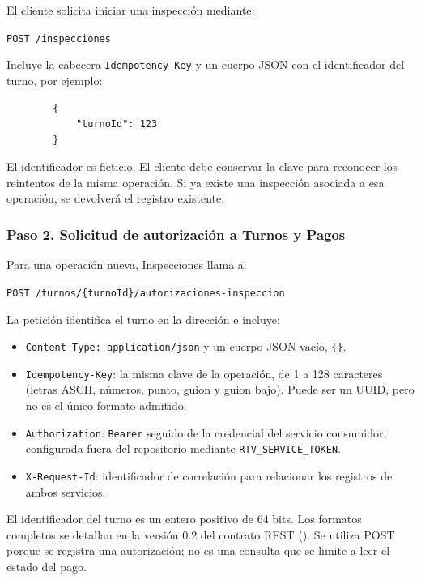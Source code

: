 \documentclass[11pt,a4paper]{article}
\begin{document}
	El cliente solicita iniciar una inspección mediante:
	
	\texttt{POST /\allowbreak{}inspecciones}
	
	Incluye la cabecera \texttt{Idempotency-Key} y un cuerpo JSON con el identificador del turno, por ejemplo:
	
	\begin{lstlisting}
		{
			"turnoId": 123
		}
	\end{lstlisting}
	
	El identificador es ficticio. El cliente debe conservar la clave para reconocer los reintentos de la misma operación. Si ya existe una inspección asociada a esa operación, se devolverá el registro existente.
	
	\subsubsection{Paso 2. Solicitud de autorización a Turnos y Pagos}
	
	Para una operación nueva, Inspecciones llama a:
	
	\texttt{POST /\allowbreak{}turnos/\allowbreak{}\{turnoId\}/\allowbreak{}autorizaciones-inspeccion}
	
	La petición identifica el turno en la dirección e incluye:
	
	\begin{itemize}[nosep]
		\item \texttt{Content-Type: application/json} y un cuerpo JSON vacío, \texttt{\{\}}.
		\item \texttt{Idempotency-Key}: la misma clave de la operación, de 1 a 128 caracteres (letras ASCII, números, punto, guion y guion bajo). Puede ser un UUID, pero no es el único formato admitido.
		\item \texttt{Authorization}: \texttt{Bearer} seguido de la credencial del servicio consumidor, configurada fuera del repositorio mediante \texttt{RTV\_SERVICE\_TOKEN}.
		\item \texttt{X-Request-Id}: identificador de correlación para relacionar los registros de ambos servicios.
	\end{itemize}
	
	El identificador del turno es un entero positivo de 64 bits. Los formatos completos se detallan en la versión 0.2 del contrato REST (). Se utiliza POST porque se registra una autorización; no es una consulta que se limite a leer el estado del pago.
	
\end{document}
